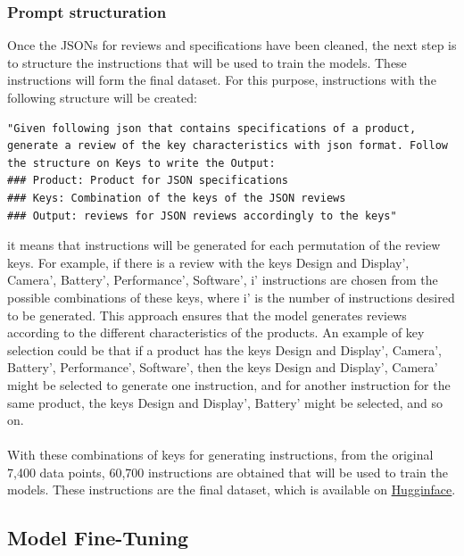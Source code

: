 \subsubsection{Prompt structuration}
Once the JSONs for reviews and specifications have been cleaned, the next step is to structure the instructions that will be used to train the models. These instructions will form the final dataset. For this purpose, instructions with the following structure will be created:
\begin{lstlisting}[style=textstyle, frame = single, caption=Prompt structuration, label=code:prompt-structuration]
"Given following json that contains specifications of a product, generate a review of the key characteristics with json format. Follow the structure on Keys to write the Output: 
### Product: Product for JSON specifications
### Keys: Combination of the keys of the JSON reviews
### Output: reviews for JSON reviews accordingly to the keys"
\end{lstlisting}
it means that instructions will be generated for each permutation of the review keys. For example, if there is a review with the keys Design and Display', Camera', Battery', Performance', Software', i' instructions are chosen from the possible combinations of these keys, where i' is the number of instructions desired to be generated. This approach ensures that the model generates reviews according to the different characteristics of the products. An example of key selection could be that if a product has the keys Design and Display', Camera', Battery', Performance', Software', then the keys Design and Display', Camera' might be selected to generate one instruction, and for another instruction for the same product, the keys Design and Display', Battery' might be selected, and so on.
\\\\
With these combinations of keys for generating instructions, from the original 7,400 data points, 60,700 instructions are obtained that will be used to train the models. These instructions are the final dataset, which is available on \href{https://huggingface.co/datasets/kokujin/json_data_luis}{Hugginface}.

\subsection{Model Fine-Tuning}
